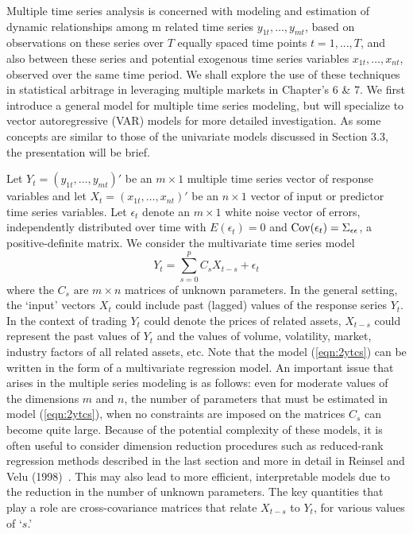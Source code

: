 Multiple time series analysis is concerned with modeling and estimation of dynamic relationships among m related time series $y_{1t},\ldots,y_{mt}$, based on observations on these series over $T$ equally spaced time points $t=1,...,T$, and also between these series and potential exogenous time series variables $x_{1t},\ldots,x_{nt}$, observed over the same time period. We shall explore the use of these techniques in statistical arbitrage in leveraging multiple markets in Chapter's 6 \& 7. We first introduce a general model for multiple time series modeling, but will specialize to vector autoregressive (VAR) models for more detailed investigation. As some concepts are similar to those of the univariate models discussed in Section 3.3, the presentation will be brief.


Let $Y_t=(y_{1t},\ldots, y_{mt})'$ be an $m \times 1$ multiple time series vector of response variables and let $X_t=(x_{1t}, \ldots, x_{nt})'$ be an $n \times 1$ vector of input or predictor time series variables. Let $\epsilon_t$ denote an $m \times 1$ white noise vector of errors, independently distributed over time with $E(\epsilon_t)=0$ and $\operatorname{Cov}(\epsilon_t)=\Sigma_{\epsilon\epsilon}$, a positive-definite matrix. We consider the multivariate time series model
	\begin{equation}\label{eqn:2ytcs}
	Y_{t} = \sum_{s=0}^{p}C_sX_{t-s}+\epsilon_t 
	\end{equation}
where the $C_s \text{ are } m\times n$ matrices of unknown parameters. In the general setting, the `input' vectors $X_t$ could include past (lagged) values of the response series $Y_t$. In the context of trading $Y_t$ could denote the prices of related assets, $X_{t-s}$ could represent the past values of $Y_t$ and the values of volume, volatility, market, industry factors of all related assets, etc. Note that the model (\ref{eqn:2ytcs}) can be written in the form of a multivariate regression model. An important issue that arises in the multiple series modeling is as follows: even for moderate values of the dimensions $m$ and $n$, the number of parameters that must be estimated in model (\ref{eqn:2ytcs}), when no constraints are imposed on the matrices $C_s$ can become quite large. Because of the potential complexity of these models, it is often useful to consider dimension reduction procedures such as reduced-rank regression methods described in the last section and more in detail in Reinsel and Velu (1998)~\cite{velurein}. This may also lead to more efficient, interpretable models due to the reduction in the number of unknown parameters. The key quantities that play a role are cross-covariance matrices that relate $X_{t-s}$ to $Y_t$, for various values of `$s$.' 


